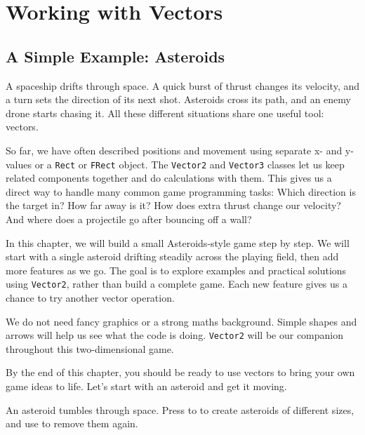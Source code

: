 \newpage
\section{Working with Vectors}\label{secVector}

\subsection{A Simple Example: Asteroids}\label{secVectorStart}

A spaceship drifts through space. A quick burst of thrust changes its velocity, and a turn sets the direction of its next shot. Asteroids cross its path, and an enemy drone starts chasing it. All these different situations share one useful tool: vectors.

So far, we have often described positions and movement using separate x- and y-values or a \texttt{Rect} or \texttt{FRect} object. The \texttt{Vector2} and \texttt{Vector3} classes let us keep related components together and do calculations with them. This gives us a direct way to handle many common game programming tasks: Which direction is the target in? How far away is it? How does extra thrust change our velocity? And where does a projectile go after bouncing off a wall?

In this chapter, we will build a small Asteroids-style game step by step. We will start with a single asteroid drifting steadily across the playing field, then add more features as we go. The goal is to explore examples and practical solutions using \texttt{Vector2}, rather than build a complete game. Each new feature gives us a chance to try another vector operation.

We do not need fancy graphics or a strong maths background. Simple shapes and arrows will help us see what the code is doing. \texttt{Vector2} will be our companion throughout this two-dimensional game.%

By the end of this chapter, you should be ready to use vectors to bring your own game ideas to life. Let's start with an asteroid and get it moving.


	An asteroid tumbles through space. Press  to  to create asteroids of different sizes, and use  to remove them again.
\er

